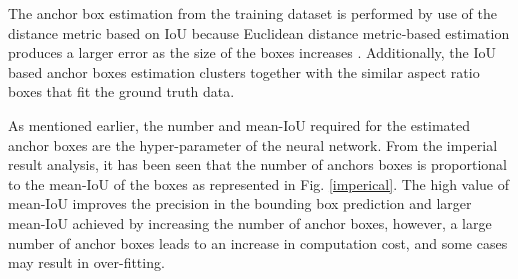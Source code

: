 The anchor box estimation from the training dataset is performed by use of the distance metric based on IoU because Euclidean distance metric-based estimation produces a larger error as the size of the boxes increases \cite{YOLO9000}.
Additionally, the IoU based anchor boxes estimation clusters together with the similar aspect ratio boxes that fit the ground truth data. 

As mentioned earlier, the number and mean-IoU required for the estimated anchor boxes are the hyper-parameter of the neural network. From the imperial result analysis, it has been seen that the number of anchors boxes is proportional to the mean-IoU of the boxes as represented in Fig. \ref{imperical}. The high value of mean-IoU improves the precision in the bounding box prediction and larger mean-IoU achieved by increasing the number of anchor boxes, however, a large number of anchor boxes leads to an increase in computation cost, and some cases may result in over-fitting.    
     
